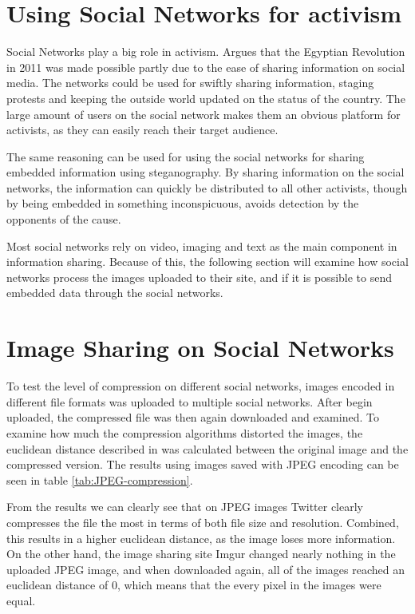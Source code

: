\clearpage
\section{Using Social Networks for activism}
Social Networks play a big role in activism. 
\citep{IJoC1242} Argues that the Egyptian Revolution in 2011 was made possible partly due to the ease of sharing information on social media. 
The networks could be used for swiftly sharing information, staging protests and keeping the outside world updated on the status of the country.
The large amount of users on the social network makes them an obvious platform for activists, as they can easily reach their target audience. 

The same reasoning can be used for using the social networks for sharing embedded information using steganography. 
By sharing information on the social networks, the information can quickly be distributed to all other activists, though by being embedded in something inconspicuous, avoids detection by the opponents of the cause.

Most social networks rely on video, imaging and text as the main component in information sharing.
Because of this, the following section will examine how social networks process the images uploaded to their site, and if it is possible to send embedded data through the social networks.

\section{Image Sharing on Social Networks}

To test the level of compression on different social networks, images encoded in different file formats was uploaded to multiple social networks. 
After begin uploaded, the compressed file was then again downloaded and examined.
To examine how much the compression algorithms distorted the images, the euclidean distance described in \citep{Wang2005} was calculated between the original image and the compressed version.
The results using images saved with JPEG encoding can be seen in table \ref{tab:JPEG-compression}. 

From the results we can clearly see that on JPEG images Twitter clearly compresses the file the most in terms of both file size and resolution.
Combined, this results in a higher euclidean distance, as the image loses more information. 
On the other hand, the image sharing site Imgur changed nearly nothing in the uploaded JPEG image, and when downloaded again, all of the images reached an euclidean distance of 0, which means that the every pixel in the images were equal.

